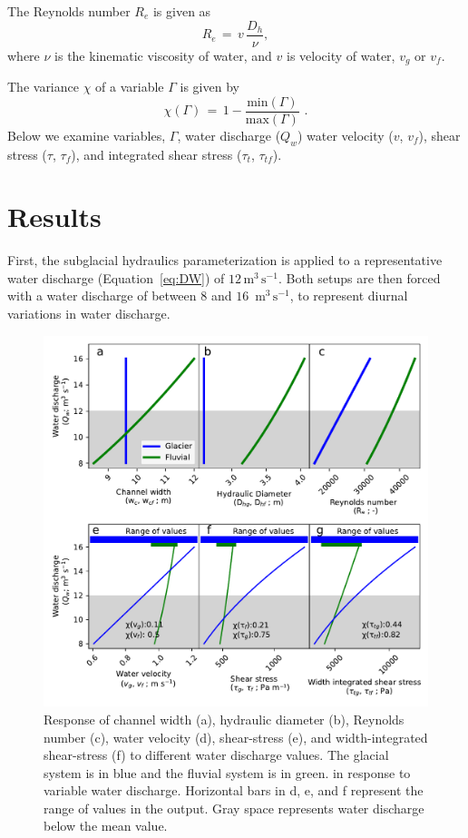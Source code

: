 \documentclass[11pt]{article}
\newcommand{\unit}[1]{$\mathrm{#1}$}
\begin{document}
\begin{spacing}{1}
  The Reynolds number $R_e$ is given as 
  \begin{equation}
    \label{eq:re}
    R_e\,=\, v \,\frac{D_h}{\nu},
  \end{equation}
  \noindent where $\nu$ is the kinematic viscosity of water, and  $v$ is velocity of water, $v_g$ or $v_f$.

  The variance $ \chi$ of a variable $\Gamma$ is given by 
  \begin{equation}
    \label{eq:var}
    \chi(\Gamma) \,=\, 1 - \frac{\mathrm{min}(\Gamma)}{\mathrm{max}(\Gamma)}\,\,.
  \end{equation}
  \noindent Below we examine variables, $\Gamma$, water discharge ($Q_w$) water velocity ($v$, $v_f$), shear stress ($\tau$, $\tau_f$), and integrated shear stress ($\tau_t$, $\tau_{tf}$).

  
  \section{Results}
  First, the subglacial hydraulics parameterization is applied to a representative water discharge (Equation~\ref{eq:DW}) of $12$\,\unit{m}$^{3}$\,\unit{s}$^{-1}$.
  Both setups are then forced with a water discharge of between $8$ and $16$ \,\unit{m}$^{3}$\,\unit{s}$^{-1}$, to represent diurnal variations in water discharge.
  
  \begin{center}
    \begin{figure}[H]
      \includegraphics[width=0.9\linewidth]{model_outputs.pdf}
      \caption{Response of channel width (a), hydraulic diameter (b),  Reynolds number  (c),  water velocity (d), shear-stress (e), and width-integrated shear-stress (f)  to different water discharge values. The glacial system is in blue and the fluvial system is in green. in response to variable water discharge. Horizontal bars in d, e, and f represent the range of values in the  output. Gray space represents water discharge below the mean value. }
      \label{fig:model_outs}
    \end{figure}
  \end{center}
  

\end{spacing}
\end{document}
